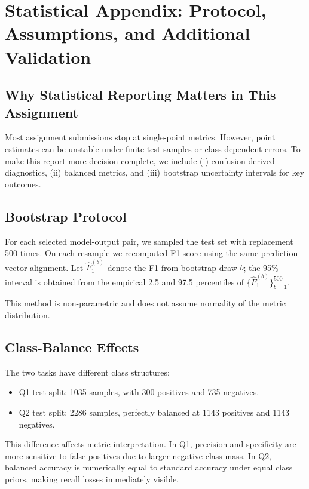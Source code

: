 \section{Statistical Appendix: Protocol, Assumptions, and Additional Validation}

\subsection{Why Statistical Reporting Matters in This Assignment}

Most assignment submissions stop at single-point metrics. However, point estimates can be unstable under finite test samples or class-dependent errors. To make this report more decision-complete, we include (i) confusion-derived diagnostics, (ii) balanced metrics, and (iii) bootstrap uncertainty intervals for key outcomes.

\subsection{Bootstrap Protocol}

For each selected model-output pair, we sampled the test set with replacement 500 times. On each resample we recomputed F1-score using the same prediction vector alignment. Let $\hat{F}_1^{(b)}$ denote the F1 from bootstrap draw $b$; the 95\% interval is obtained from the empirical 2.5 and 97.5 percentiles of $\{\hat{F}_1^{(b)}\}_{b=1}^{500}$.

This method is non-parametric and does not assume normality of the metric distribution.

\subsection{Class-Balance Effects}

The two tasks have different class structures:
\begin{itemize}
    \item Q1 test split: 1035 samples, with 300 positives and 735 negatives.
    \item Q2 test split: 2286 samples, perfectly balanced at 1143 positives and 1143 negatives.
\end{itemize}

This difference affects metric interpretation. In Q1, precision and specificity are more sensitive to false positives due to larger negative class mass. In Q2, balanced accuracy is numerically equal to standard accuracy under equal class priors, making recall losses immediately visible.

